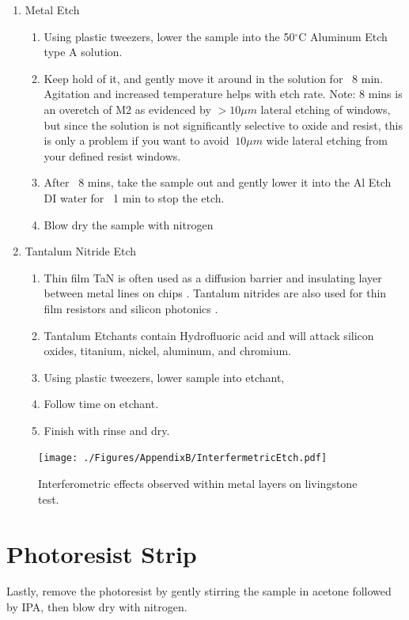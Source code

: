 \begin{enumerate}
\begin{enumerate}
    \end{enumerate}
    \item Metal Etch
    \begin{enumerate}
        \item Using plastic tweezers, lower the sample into the 50$^\circ$C Aluminum Etch type A solution.
        \item Keep hold of it, and gently move it around in the solution for ~8 min. Agitation and increased temperature helps with etch rate. Note: 8 mins is an overetch of M2 as evidenced by $> 10 \mu m$ lateral etching of windows, but since the solution is not significantly selective to oxide and resist, this is only a problem if you want to avoid $~10 \mu m$ wide lateral etching from your defined resist windows. 
        \item After ~8 mins, take the sample out and gently lower it into the Al Etch DI water for ~1 min to stop the etch.
        \item Blow dry the sample with nitrogen 
    \end{enumerate}
    \item Tantalum Nitride Etch
    \begin{enumerate}
        \item Thin film TaN is often used as a diffusion barrier and insulating layer between metal lines on chips \cite{Tantalum}. Tantalum nitrides are also used for thin film resistors and silicon photonics \cite{Tantalum1}. 
        \item Tantalum Etchants contain Hydrofluoric acid and will attack silicon oxides, titanium, nickel, aluminum, and chromium.
        \item Using plastic tweezers, lower sample into etchant,  
        \item Follow time on etchant. 
        \item Finish with rinse and dry.  
    \end{enumerate}
\end{enumerate}

\begin{figure}[!htbp]
\centering
\texttt{[image: ./Figures/AppendixB/InterfermetricEtch.pdf]}
\caption{Interferometric effects observed within metal layers on livingstone test.}
\label{FigAppB3}
\end{figure}

\section{Photoresist Strip}
Lastly, remove the photoresist by gently stirring the sample in acetone followed by IPA, then blow dry with nitrogen. 

